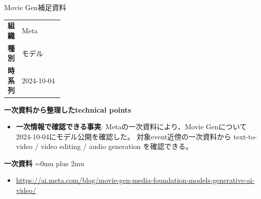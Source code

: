 \begin{technicalnote}{Movie Gen}{補足資料}
\begingroup
\begin{tabularx}{\linewidth}{@{}>{\bfseries}p{0.22\linewidth}X@{}}
組織 & Meta \\
種別 & モデル \\
時系列 & 2024-10-04 \\
\end{tabularx}
\smallskip
{\bfseries 一次資料から整理したtechnical points}
\begin{itemize}[leftmargin=1.5em,itemsep=0.35em]
\item \textbf{一次情報で確認できる事実}: Metaの一次資料により、Movie Genについて2024-10-04にモデル公開を確認した。 対象event近傍の一次資料から text-to-video / video editing / audio generation を確認できる。
\end{itemize}
\begin{minipage}{\linewidth}
\begin{samepage}
{\bfseries 一次資料}
\begingroup\sloppy
\Urlmuskip=0mu plus 2mu\relax
\begin{itemize}[leftmargin=1.5em,itemsep=0.25em]
\item {\scriptsize\url{https://ai.meta.com/blog/movie-gen-media-foundation-models-generative-ai-video/}}
\end{itemize}
\endgroup
\end{samepage}
\end{minipage}
\endgroup
\end{technicalnote}
\medskip

